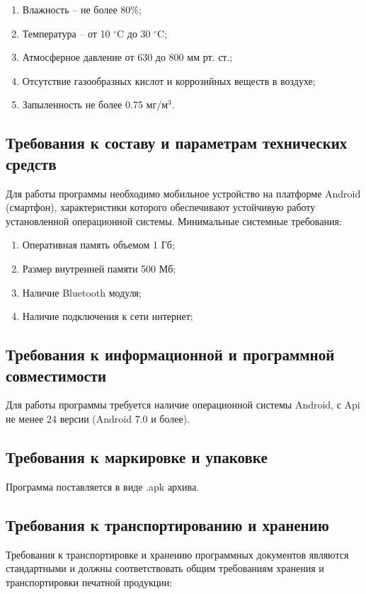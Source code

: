 \documentclass[techtask]{espd}
\begin{document}
\begin{enumerate}
\item Влажность -- не более 80\%;
\item Температура -- от 10 $^\circ$C до 30 $^\circ$C;
\item Атмосферное давление от 630 до 800 мм рт. ст.;
\item Отсутствие газообразных кислот и коррозийных веществ в воздухе;
\item Запыленность не более 0.75 мг/м$^3$.
\end{enumerate}

\subsection{Требования к составу и параметрам технических средств}\label{subsection:requirements}
Для работы программы необходимо мобильное устройство на платформе Android (смартфон), характеристики которого обеспечивают устойчивую работу установленной операционной системы. Минимальные системные требования:

\begin{enumerate}
\item Оперативная память объемом 1 Гб;
\item Размер внутренней памяти 500 Мб;
\item Наличие Bluetooth модуля;
\item Наличие подключения к сети интернет;
\end{enumerate}

\subsection{Требования к информационной и программной совместимости}
Для работы программы требуется наличие операционной системы Android, с Api не менее 24 версии (Android 7.0 и более).

\subsection{Требования к маркировке и упаковке}
Программа поставляется в виде .apk архива.

\subsection{Требования к транспортированию и хранению}
Требования к транспортировке и хранению программных документов являются стандартными и должны соответствовать общим требованиям хранения и транспортировки печатной продукции:
\end{document}
